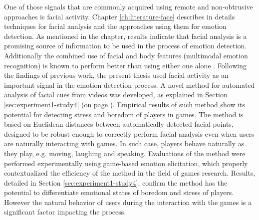One of those signals that are commonly acquired using remote and non-obtrusive approaches is facial activity. Chapter \ref{ch:literature-face} describes in details techniques for facial analysis and the approaches using them for emotion detection. As mentioned in the chapter, results indicate that facial analysis is a promising source of information to be used in the process of emotion detection. Additionally  the combined use of facial and body features (multimodal emotion recognition) is known to perform better than using either one alone \parencite{zacharatos2014automatic}. Following the findings of previous work, the present thesis used facial activity as an important signal in the emotion detection process. A novel method for automated analysis of facial cues from videos was developed, as explained in Section \ref{sec:experiment1-study4} (on page \pageref{sec:experiment1-study4}). Empirical results of such method show its potential for detecting stress and boredom of players in games. The method is based on Euclidean distances between automatically detected facial points, designed to be robust enough to correctly perform facial analysis even when users are naturally interacting with games. In such case, players behave naturally as they play, e.g. moving, laughing and speaking. Evaluations of the method were performed experimentally using game-based emotion elicitation, which properly contextualized the efficiency of the method in the field of games research. Results, detailed in Section \ref{sec:experiment1-study4}, confirm the method has the potential to differentiate emotional states of boredom and stress of players. However the natural behavior of users during the interaction with the games is a significant factor impacting the process.


